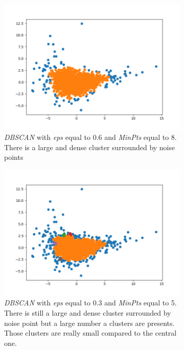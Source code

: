 \begin{figure}[ht]
    \centering
    \begin{subfigure}{0.46\paperwidth}
        \centering
        \includegraphics[width=0.9\linewidth]{img/clust_1/dbscan.png}
        \caption{\emph{DBSCAN} with \emph{eps} equal to 0.6 and \emph{MinPts} equal to 8. There is a large and dense cluster surrounded by noise points}
        \label{fig:dbscan_good}
    \end{subfigure}
    \begin{subfigure}{0.45\paperwidth}
        \centering
        \includegraphics[width=0.9\linewidth]{img/clust_1/dbscan_bad.png}
        \caption{\emph{DBSCAN} with \emph{eps} equal to 0.3 and \emph{MinPts} equal to 5. There is still a large and dense cluster surrounded by noise point but a large number a clusters are presents. Those clusters are really small compared to the central one.}
        \label{fig:dbscan_bad}
    \end{subfigure}
    \caption{}
    \label{fig:dbscan}
\end{figure}
